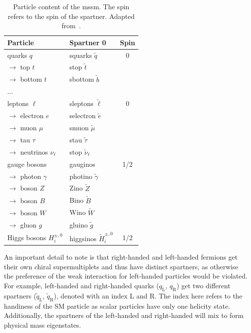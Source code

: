 \begin{table}
	\centering
	\small
	\setlength\heavyrulewidth{0.2ex}
	\caption{Particle content of the \gls{mssm}. The spin refers to the spin of the spartner. Adapted from~\cite{Bustamante:2009us}.}
	\begin{tabular} {l l c}
		
		\toprule
		Particle & Spartner 0 & Spin \\ 
		\midrule 
		quarks $q$ & squarks $\tilde{q}$ & 0 \\
		$\rightarrow$ top $t$ & stop $\tilde{t}$ & \\
		$\rightarrow$ bottom $t$ & sbottom $\tilde{b}$ & \\
		$\dots$ & & \\
		leptons $\ell$ & sleptons $\tilde{\ell}$ & 0 \\
		$\rightarrow$ electron $e$ & selectron $\tilde{e}$ & \\
		$\rightarrow$ muon $\mu$ & smuon $\tilde{\mu}$ & \\
		$\rightarrow$ tau $\tau$ & stau $\tilde{\tau}$ & \\
		$\rightarrow$ neutrinos $\nu_\ell$ & stop $\tilde{\nu}_\ell$ & \\
		\midrule
		gauge bosons & gauginos & 1/2 \\
		$\rightarrow$ photon $\gamma$ & photino $\tilde{\gamma}$ & \\
		$\rightarrow$ boson $Z$ & Zino $\tilde{Z}$ & \\
		$\rightarrow$ boson $B$ & Bino $\tilde{B}$ & \\
		$\rightarrow$ boson $W$ & Wino $\tilde{W}$ & \\
		$\rightarrow$ gluon $g$ & gluino $\tilde{g}$ & \\
		\midrule
		Higgs bosons $H^{\pm,0}_i$ & higgsinos $\tilde{H}^{\pm,0}_i$ & 1/2 \\
		\bottomrule
	\end{tabular}\vspace{3mm}
	\label{tab:particles_MSSM}   
\end{table}

An important detail to note is that right-handed and left-handed fermions get their own chiral supermultiplets and thus have distinct spartners, as otherwise the preference of the weak interaction for left-handed particles would be violated. 
For example, left-handed and right-handed quarks ($q_\mathrm{L}$, $q_\mathrm{R}$) get two different spartners ($\tilde{q}_\mathrm{L}$, $\tilde{q}_\mathrm{R}$), denoted with an index L and R.
The index here refers to the handiness of the SM particle as scalar particles have only one helicity state. Additionally, the spartners of the left-handed and right-handed will mix to form physical mass eigenstates.

